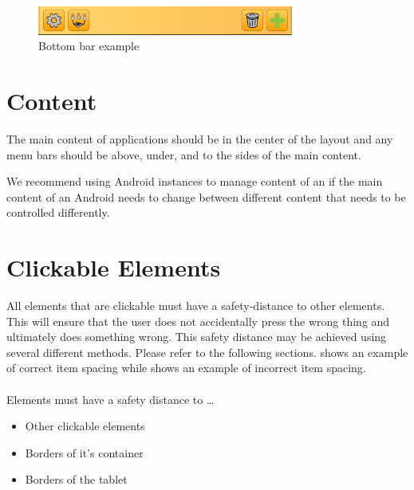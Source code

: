 \begin{figure}[!htbp]
        \centering
        \includegraphics[width=0.75\textwidth]{pictures/application_structure/bottombar}
        \caption{Bottom bar example}
        \label{fig:bottom_bar_example}
\end{figure}

\FloatBarrier


\section{Content}
The main content of applications should be in the center of the layout and any menu bars should be above, under, and to the sides of the main content. 

\begin{note}
We recommend using Android  instances to manage content of an  if the main content of an Android  needs to change between different content that needs to be controlled differently. 
\end{note}


\section{Clickable Elements}
All elements that are clickable must have a safety-distance to other elements. This will ensure that the user does not accidentally press the wrong thing and ultimately does something wrong. This safety distance may be achieved using several different methods. Please refer to the following sections.  shows an example of correct item spacing while  shows an example of incorrect item spacing.
\\\\
Elements must have a safety distance to \ldots
{}
\begin{itemize}
        \item Other clickable elements
        \item Borders of it's container
        \item Borders of the tablet
\end{itemize}

